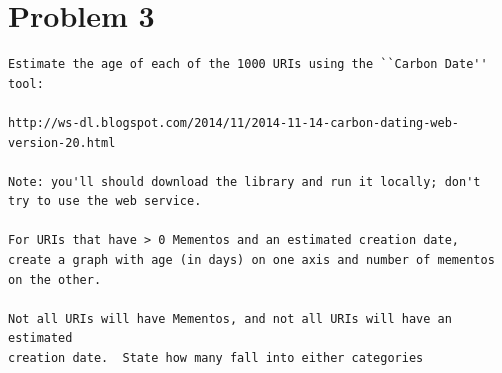 \section{Problem 3}
\label{part3}
\begin{verbatim}
Estimate the age of each of the 1000 URIs using the ``Carbon Date'' tool:

http://ws-dl.blogspot.com/2014/11/2014-11-14-carbon-dating-web-version-20.html

Note: you'll should download the library and run it locally; don't
try to use the web service.

For URIs that have > 0 Mementos and an estimated creation date,
create a graph with age (in days) on one axis and number of mementos
on the other.  

Not all URIs will have Mementos, and not all URIs will have an estimated
creation date.  State how many fall into either categories

\end{verbatim}
